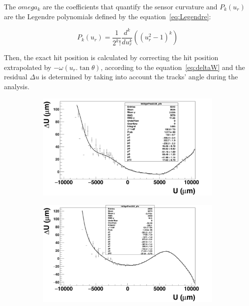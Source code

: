       The $omega_{k}$ are the coefficients that quantify the sensor curvature and $P_{k}(u_{r})$ are the Legendre polynomials defined by the equation~\ref{eq:Legendre}:

      \begin{equation}
        P_{k}\left(u_{r}\right) = \frac{1}{2^{k}!}\frac{d^{k}}{du_{r}^{k}} \left( (u_{r}^2 - 1)^{k}\right)
        \label{eq:Legendre}
      \end{equation}

      Then, the exact hit position is calculated by correcting the hit position extrapolated by $-\omega(u_{r}.\tan{\theta})$, according to the equation~\ref{eq:deltaW} and the residual $\Delta u$ is determined by taking into account the tracks' angle during the analysis.      

      \begin{figure}[h]
        \centering
        \begin{subfigure}[t]{0.45\textwidth}
          \centering
          \includegraphics[width = 1.2\textwidth]{Pictures/deformation/profileFitted_pl8.png}
          \caption{}
          \label{fig:profileFitted_front}
        \end{subfigure}
        \hfill
        \begin{subfigure}[t]{0.45\textwidth}
          \centering
          \includegraphics[width = 1.2\textwidth]{Pictures/deformation/profileFitted_pl6.png}

\end{subfigure}
\end{figure}
